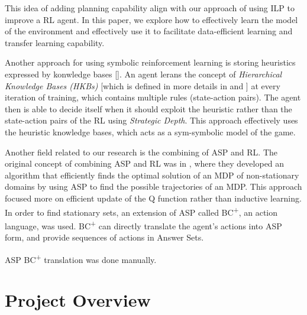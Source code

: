 \documentclass[12pt,twoside]{report}
\begin{document}
This idea of adding planning capability align with our approach of using ILP to improve a RL agent. In this paper, we explore how to effectively learn the model of the environment and effectively use it to facilitate data-efficient learning and transfer learning capability.




Another approach for using symbolic reinforcement learning is storing heuristics expressed by konwledge bases [\cite{Apeldoorn2017}].  An agent lerans the concept of \textit{Hierarchical Knowledge Bases (HKBs)} [which is defined in more details in \cite{Apeldoorn2016} and \cite{Apeldoorn}] at every iteration of training, which contains multiple rules (state-action pairs).  The agent then is able to decide itself when it should exploit the heuristic rather than the state-action pairs of the RL using  \textit{Strategic Depth}. This approach effectively uses the heuristic knowledge bases, which acts as a sym-symbolic model of the game.

Another field related to our research is the combining of ASP and RL. The original concept of combining ASP and RL was in \cite{Ferreira2017}, where they developed an algorithm that efficiently finds the optimal solution of an MDP of non-stationary domains by using ASP to find the possible trajectories of an MDP. This approach focused more on efficient update of the Q function rather than inductive learning. In order to find stationary sets, an extension of ASP called BC\textsuperscript{+}, an action language,  was used. BC\textsuperscript{+} can directly translate the agent's actions into ASP form, and provide sequences of actions in Answer Sets.

ASP BC\textsuperscript{+} translation was done manually.



\chapter{Project Overview}
\label{project_overview}
\end{document}
